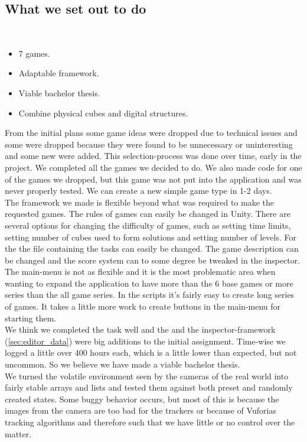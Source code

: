 \subsection{What we set out to do}

\begin{description}
	\item {}

	\item[Result goals]\ 
	\begin{itemize}
		\item 7 games.
		\item Adaptable framework.
		\item Viable bachelor thesis.
		\item Combine physical cubes and digital structures.
	\end{itemize}
	From the initial plans some game ideas were dropped due to technical issues and some were dropped because they were found to be unnecessary or uninteresting and some new were added. 
	This selection-process was done over time, early in the project. We completed all the games we decided to do. 
	We also made code for one of the games we dropped, but this game was not put into the application and was never properly tested. 
	We can create a new simple game type in 1-2 days.\\
	The framework we made is flexible beyond what was required to make the requested games. 
	The rules of games can easily be changed in Unity. 
	There are several options for changing the difficulty of games, such as setting time limits, setting number of cubes used to form solutions and setting number of levels. 
	For the \nameref{game:wo0ord_game} the file containing the tasks can easily be changed. 
	The game description can be changed and the score system can to some degree be tweaked in the inspector. 
	The main-menu is not as flexible and it is the most problematic area when wanting to expand the application to have more than the 6 base games or more series than the all game series. 
	\todo{is this ok?}
	In the scripts it's fairly easy to create long series of games. It takes a little more work to create buttons in the main-menu for starting them.\\
	We think we completed the task well and the \nameref{game:wo0ord_game} and the inspector-framework (\ref{sec:editor_data}) were big additions to the initial assignment. Time-wise we logged a little over 400 hours each, which is a little lower than expected, but not uncommon. So we believe we have made a viable bachelor thesis.\\
	We turned the volatile environment seen by the cameras of the real world
	into fairly stable arrays and lists and tested them against both preset 
	and randomly created states. Some buggy behavior occurs, but most of this
	is because the images from the camera are too bad for the trackers or because
	of Vuforias tracking algorithms and therefore such that we have little or no control over the matter.\\


\end{description}
